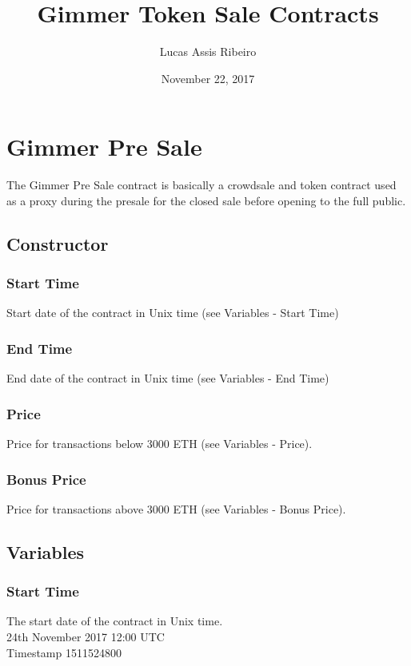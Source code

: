 \documentclass[11pt]{article} %
\title{Gimmer Token Sale Contracts}
\author{Lucas Assis Ribeiro}
\date{November 22, 2017} %
\begin{document}
\maketitle

\section {Gimmer Pre Sale}

The Gimmer Pre Sale contract is basically a crowdsale and token contract used as a proxy during the presale for the closed sale before opening to the full public.

\subsection{Constructor}
\subsubsection{Start Time}
Start date of the contract in Unix time (see Variables - Start Time)

\subsubsection{End Time}
End date of the contract in Unix time (see Variables - End Time)

\subsubsection{Price}
Price for transactions below 3000 ETH (see Variables - Price).

\subsubsection{Bonus Price}
Price for transactions above 3000 ETH (see Variables - Bonus Price).


\subsection{Variables}

\subsubsection{Start Time}
The start date of the contract in Unix time. \\
24th November 2017 12:00 UTC\\
Timestamp 1511524800 
\end{document}
